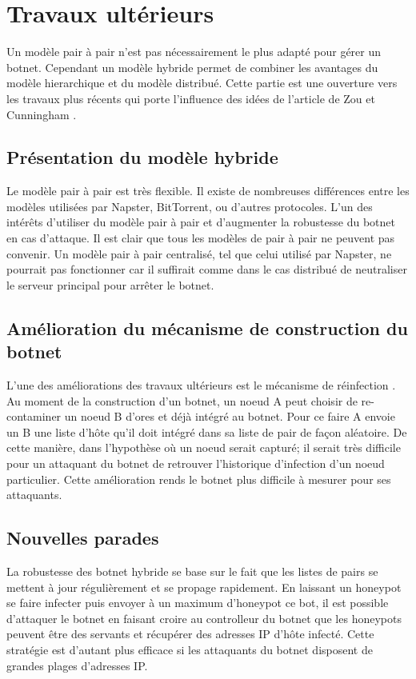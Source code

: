 \section{Travaux ultérieurs}

Un modèle pair à pair n'est pas nécessairement le plus adapté pour
gérer un botnet. Cependant un modèle hybride permet de combiner les
avantages du modèle hierarchique et du modèle distribué. Cette partie
est une ouverture vers les travaux plus récents qui porte l'influence
des idées de l'article de Zou et Cunningham \cite{main}.

\subsection{Présentation du modèle hybride}

Le modèle pair à pair est très flexible. Il existe de nombreuses différences
entre les modèles utilisées par Napster, BitTorrent, ou d'autres protocoles.
L'un des intérêts d'utiliser du modèle pair à pair et d'augmenter la robustesse
du botnet en cas d'attaque. Il est clair que tous les modèles de pair à pair ne
peuvent pas convenir. Un modèle pair à pair centralisé, tel que celui utilisé
par Napster, ne pourrait pas fonctionner car il suffirait comme dans le cas
distribué de neutraliser le serveur principal pour arrêter le botnet.

\subsection{Amélioration du mécanisme de construction du botnet}

L'une des améliorations des travaux ultérieurs est le mécanisme de réinfection \cite{p2p}.
Au moment de la construction d'un botnet, un noeud A peut choisir de re-contaminer un noeud B
d'ores et déjà intégré au botnet. Pour ce faire A envoie un B une liste d'hôte qu'il doit intégré
dans sa liste de pair de façon aléatoire. De cette manière, dans l'hypothèse où un
noeud serait capturé; il serait très difficile pour un attaquant du botnet de retrouver
l'historique d'infection d'un noeud particulier. Cette amélioration rends le botnet
plus difficile à mesurer pour ses attaquants.


\subsection{Nouvelles parades}

La robustesse des botnet hybride se base sur le fait que les listes de pairs se mettent à jour
régulièrement et se propage rapidement. En laissant un
honeypot se faire infecter puis envoyer à un maximum d'honeypot ce bot, il est possible d'attaquer
le botnet en faisant croire au controlleur du botnet que les honeypots peuvent être des servants
et récupérer des adresses IP d'hôte infecté. Cette stratégie est d'autant plus efficace si les
attaquants du botnet disposent de grandes plages d'adresses IP.


